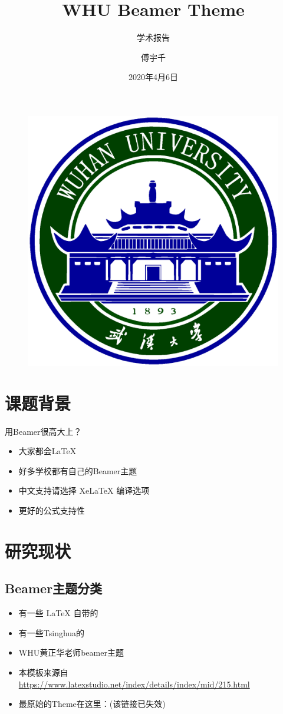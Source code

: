 \documentclass{beamer}
\author{傅宇千}
\title{WHU Beamer Theme}
\subtitle{学术报告}
\institute{武汉大学电子信息学院}
\date{2020年4月6日}
\begin{document}
\kaishu
\begin{frame}
	\titlepage
	\begin{figure}[htpb]
		\begin{center}
			\includegraphics[width=0.2\linewidth]{pic/whulogo.eps}
		\end{center}
	\end{figure}
\end{frame}
\begin{frame}
\tableofcontents[sectionstyle=show,subsectionstyle=show/shaded/hide,subsubsectionstyle=show/shaded/hide]
\end{frame}


\section{课题背景}

\begin{frame}{用Beamer很高大上？}
\begin{itemize}
\item 大家都会\LaTeX{}
\item 好多学校都有自己的Beamer主题
\item 中文支持请选择 Xe\LaTeX{} 编译选项
\item 更好的公式支持性
\end{itemize}
\end{frame}

\section{研究现状}

\subsection{Beamer主题分类}

\begin{frame}
\begin{itemize}
\item 有一些 \LaTeX{} 自带的
\item 有一些Tsinghua的
\item WHU黄正华老师beamer主题
\item 本模板来源自 \newline \url{https://www.latexstudio.net/index/details/index/mid/215.html}
\item 最原始的Theme在这里：\cite{origin}(该链接已失效)
\end{itemize}
\end{frame}
\end{document}
